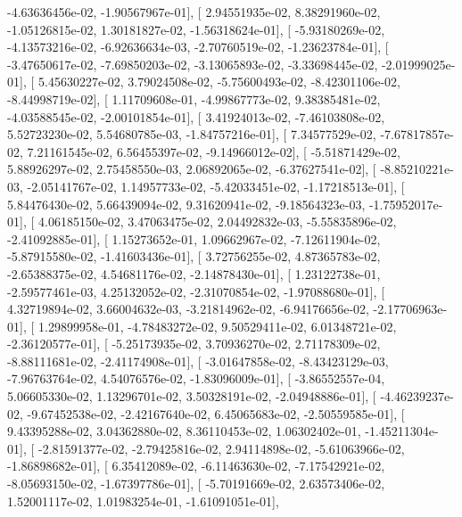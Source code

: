 \documentclass{article}
\begin{document}
         -4.63636456e-02,  -1.90567967e-01],
       [  2.94551935e-02,   8.38291960e-02,  -1.05126815e-02,
          1.30181827e-02,  -1.56318624e-01],
       [ -5.93180269e-02,  -4.13573216e-02,  -6.92636634e-03,
         -2.70760519e-02,  -1.23623784e-01],
       [ -3.47650617e-02,  -7.69850203e-02,  -3.13065893e-02,
         -3.33698445e-02,  -2.01999025e-01],
       [  5.45630227e-02,   3.79024508e-02,  -5.75600493e-02,
         -8.42301106e-02,  -8.44998719e-02],
       [  1.11709608e-01,  -4.99867773e-02,   9.38385481e-02,
         -4.03588545e-02,  -2.00101854e-01],
       [  3.41924013e-02,  -7.46103808e-02,   5.52723230e-02,
          5.54680785e-03,  -1.84757216e-01],
       [  7.34577529e-02,  -7.67817857e-02,   7.21161545e-02,
          6.56455397e-02,  -9.14966012e-02],
       [ -5.51871429e-02,   5.88926297e-02,   2.75458550e-03,
          2.06892065e-02,  -6.37627541e-02],
       [ -8.85210221e-03,  -2.05141767e-02,   1.14957733e-02,
         -5.42033451e-02,  -1.17218513e-01],
       [  5.84476430e-02,   5.66439094e-02,   9.31620941e-02,
         -9.18564323e-03,  -1.75952017e-01],
       [  4.06185150e-02,   3.47063475e-02,   2.04492832e-03,
         -5.55835896e-02,  -2.41092885e-01],
       [  1.15273652e-01,   1.09662967e-02,  -7.12611904e-02,
         -5.87915580e-02,  -1.41603436e-01],
       [  3.72756255e-02,   4.87365783e-02,  -2.65388375e-02,
          4.54681176e-02,  -2.14878430e-01],
       [  1.23122738e-01,  -2.59577461e-03,   4.25132052e-02,
         -2.31070854e-02,  -1.97088680e-01],
       [  4.32719894e-02,   3.66004632e-03,  -3.21814962e-02,
         -6.94176656e-02,  -2.17706963e-01],
       [  1.29899958e-01,  -4.78483272e-02,   9.50529411e-02,
          6.01348721e-02,  -2.36120577e-01],
       [ -5.25173935e-02,   3.70936270e-02,   2.71178309e-02,
         -8.88111681e-02,  -2.41174908e-01],
       [ -3.01647858e-02,  -8.43423129e-03,  -7.96763764e-02,
          4.54076576e-02,  -1.83096009e-01],
       [ -3.86552557e-04,   5.06605330e-02,   1.13296701e-02,
          3.50328191e-02,  -2.04948886e-01],
       [ -4.46239237e-02,  -9.67452538e-02,  -2.42167640e-02,
          6.45065683e-02,  -2.50559585e-01],
       [  9.43395288e-02,   3.04362880e-02,   8.36110453e-02,
          1.06302402e-01,  -1.45211304e-01],
       [ -2.81591377e-02,  -2.79425816e-02,   2.94114898e-02,
         -5.61063966e-02,  -1.86898682e-01],
       [  6.35412089e-02,  -6.11463630e-02,  -7.17542921e-02,
         -8.05693150e-02,  -1.67397786e-01],
       [ -5.70191669e-02,   2.63573406e-02,   1.52001117e-02,
          1.01983254e-01,  -1.61091051e-01],
\end{document}
